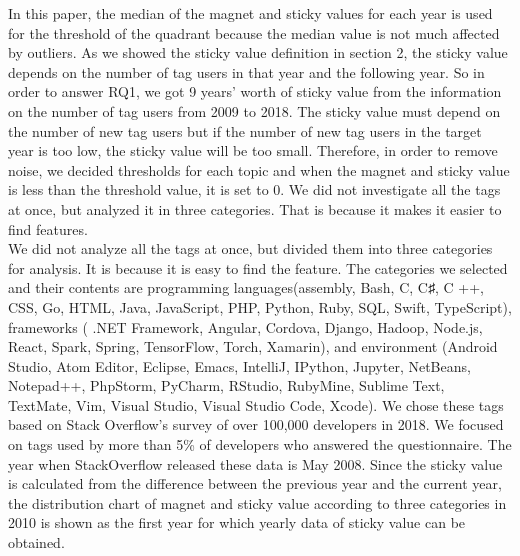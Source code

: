 \documentclass[conference]{IEEEtran}
\begin{document}
In this paper, the median of the magnet and sticky values for each year is used for the threshold of the quadrant because the median value is not much affected by outliers. As we showed the sticky value definition in section 2, the sticky value depends on the number of tag users in that year and the following year. So in order to answer RQ1, we got 9 years' worth of sticky value from the information on the number of tag users from 2009 to 2018. The sticky value must depend on the number of new tag users but if the number of new tag users in the target year is too low, the sticky value will be too small. Therefore, in order to remove noise, we decided thresholds for each topic and when the magnet and sticky value is less than the threshold value, it is set to 0.
We did not investigate all the tags at once, but analyzed it in three categories. That is because it makes it easier to find features.\\

We did not analyze all the tags at once, but divided them into three categories for analysis. It is because it is easy to find the feature. The categories we selected and their contents are programming languages ​​(assembly, Bash, C, C♯, C ++, CSS, Go, HTML, Java, JavaScript, PHP, Python, Ruby, SQL, Swift, TypeScript), frameworks ( .NET Framework, Angular, Cordova, Django, Hadoop, Node.js, React, Spark, Spring, TensorFlow, Torch, Xamarin), and environment (Android Studio, Atom Editor, Eclipse, Emacs, IntelliJ, IPython, Jupyter, NetBeans, Notepad++, PhpStorm, PyCharm, RStudio, RubyMine, Sublime Text, TextMate, Vim, Visual Studio, Visual Studio Code, Xcode).
We chose these tags based on Stack Overflow's survey of over 100,000 developers in 2018. We focused on tags used by more than 5\% of developers who answered the questionnaire. The year when StackOverflow released these data is May 2008. Since the sticky value is calculated from the difference between the previous year and the current year, the distribution chart of magnet and sticky value according to three categories in 2010 is shown as the first year for which yearly data of sticky value can be obtained.

\end{document}
